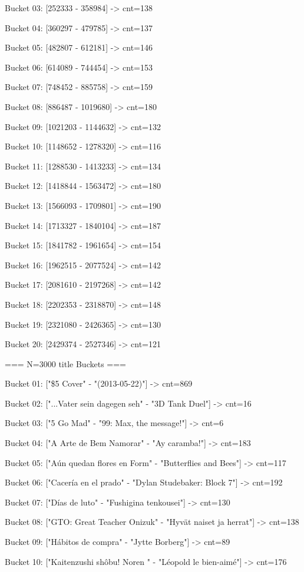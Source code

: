 \documentclass[11pt,a4paper]{article}
\begin{document}
Bucket 03: [252333 - 358984] -> cnt=138

Bucket 04: [360297 - 479785] -> cnt=137

Bucket 05: [482807 - 612181] -> cnt=146

Bucket 06: [614089 - 744454] -> cnt=153

Bucket 07: [748452 - 885758] -> cnt=159

Bucket 08: [886487 - 1019680] -> cnt=180

Bucket 09: [1021203 - 1144632] -> cnt=132

Bucket 10: [1148652 - 1278320] -> cnt=116

Bucket 11: [1288530 - 1413233] -> cnt=134

Bucket 12: [1418844 - 1563472] -> cnt=180

Bucket 13: [1566093 - 1709801] -> cnt=190

Bucket 14: [1713327 - 1840104] -> cnt=187

Bucket 15: [1841782 - 1961654] -> cnt=154

Bucket 16: [1962515 - 2077524] -> cnt=142

Bucket 17: [2081610 - 2197268] -> cnt=142

Bucket 18: [2202353 - 2318870] -> cnt=148

Bucket 19: [2321080 - 2426365] -> cnt=130

Bucket 20: [2429374 - 2527346] -> cnt=121


=== N=3000 title Buckets ===

Bucket 01: ["\$5 Cover" - "(2013-05-22)"] -> cnt=869

Bucket 02: ["...Vater sein dagegen seh" - "3D Tank Duel"] -> cnt=16

Bucket 03: ["5 Go Mad" - "99: Max, the message!"] -> cnt=6

Bucket 04: ["A Arte de Bem Namorar" - "Ay caramba!"] -> cnt=183

Bucket 05: ["Aún quedan flores en Form" - "Butterflies and Bees"] -> cnt=117

Bucket 06: ["Cacería en el prado" - "Dylan Studebaker: Block 7"] -> cnt=192

Bucket 07: ["Días de luto" - "Fushigina tenkousei"] -> cnt=130

Bucket 08: ["GTO: Great Teacher Onizuk" - "Hyvät naiset ja herrat"] -> cnt=138

Bucket 09: ["Hábitos de compra" - "Jytte Borberg"] -> cnt=89

Bucket 10: ["Kaitenzushi shôbu! Noren " - "Léopold le bien-aimé"] -> cnt=176
\end{document}
